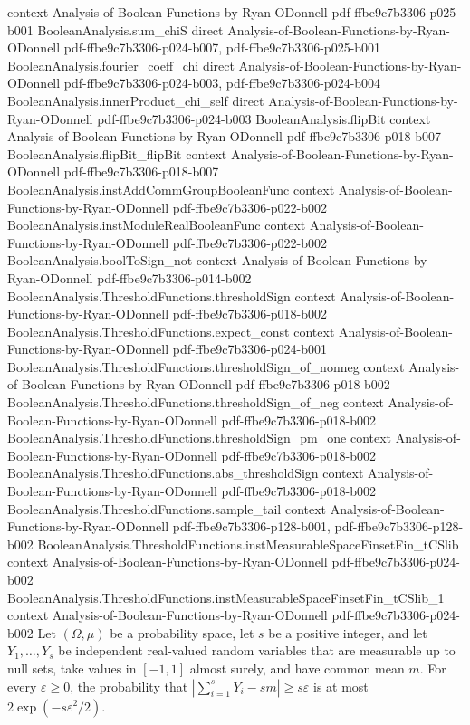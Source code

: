 \begin{theorem}
  {context}
  {Analysis-of-Boolean-Functions-by-Ryan-ODonnell}
  {pdf-ffbe9c7b3306-p025-b001}
\proofstep
  {BooleanAnalysis.sum_chiS}
  {direct}
  {Analysis-of-Boolean-Functions-by-Ryan-ODonnell}
  {pdf-ffbe9c7b3306-p024-b007,
    pdf-ffbe9c7b3306-p025-b001}
\proofstep
  {BooleanAnalysis.fourier_coeff_chi}
  {direct}
  {Analysis-of-Boolean-Functions-by-Ryan-ODonnell}
  {pdf-ffbe9c7b3306-p024-b003,
    pdf-ffbe9c7b3306-p024-b004}
\proofstep
  {BooleanAnalysis.innerProduct_chi_self}
  {direct}
  {Analysis-of-Boolean-Functions-by-Ryan-ODonnell}
  {pdf-ffbe9c7b3306-p024-b003}
\proofstep
  {BooleanAnalysis.flipBit}
  {context}
  {Analysis-of-Boolean-Functions-by-Ryan-ODonnell}
  {pdf-ffbe9c7b3306-p018-b007}
\proofstep
  {BooleanAnalysis.flipBit_flipBit}
  {context}
  {Analysis-of-Boolean-Functions-by-Ryan-ODonnell}
  {pdf-ffbe9c7b3306-p018-b007}
\proofstep
  {BooleanAnalysis.instAddCommGroupBooleanFunc}
  {context}
  {Analysis-of-Boolean-Functions-by-Ryan-ODonnell}
  {pdf-ffbe9c7b3306-p022-b002}
\proofstep
  {BooleanAnalysis.instModuleRealBooleanFunc}
  {context}
  {Analysis-of-Boolean-Functions-by-Ryan-ODonnell}
  {pdf-ffbe9c7b3306-p022-b002}
\proofstep
  {BooleanAnalysis.boolToSign_not}
  {context}
  {Analysis-of-Boolean-Functions-by-Ryan-ODonnell}
  {pdf-ffbe9c7b3306-p014-b002}
\proofstep
  {BooleanAnalysis.ThresholdFunctions.thresholdSign}
  {context}
  {Analysis-of-Boolean-Functions-by-Ryan-ODonnell}
  {pdf-ffbe9c7b3306-p018-b002}
\proofstep
  {BooleanAnalysis.ThresholdFunctions.expect_const}
  {context}
  {Analysis-of-Boolean-Functions-by-Ryan-ODonnell}
  {pdf-ffbe9c7b3306-p024-b001}
\proofstep
  {BooleanAnalysis.ThresholdFunctions.thresholdSign_of_nonneg}
  {context}
  {Analysis-of-Boolean-Functions-by-Ryan-ODonnell}
  {pdf-ffbe9c7b3306-p018-b002}
\proofstep
  {BooleanAnalysis.ThresholdFunctions.thresholdSign_of_neg}
  {context}
  {Analysis-of-Boolean-Functions-by-Ryan-ODonnell}
  {pdf-ffbe9c7b3306-p018-b002}
\proofstep
  {BooleanAnalysis.ThresholdFunctions.thresholdSign_pm_one}
  {context}
  {Analysis-of-Boolean-Functions-by-Ryan-ODonnell}
  {pdf-ffbe9c7b3306-p018-b002}
\proofstep
  {BooleanAnalysis.ThresholdFunctions.abs_thresholdSign}
  {context}
  {Analysis-of-Boolean-Functions-by-Ryan-ODonnell}
  {pdf-ffbe9c7b3306-p018-b002}
\proofstep
  {BooleanAnalysis.ThresholdFunctions.sample_tail}
  {context}
  {Analysis-of-Boolean-Functions-by-Ryan-ODonnell}
  {pdf-ffbe9c7b3306-p128-b001,
    pdf-ffbe9c7b3306-p128-b002}
\proofstep
  {BooleanAnalysis.ThresholdFunctions.instMeasurableSpaceFinsetFin_tCSlib}
  {context}
  {Analysis-of-Boolean-Functions-by-Ryan-ODonnell}
  {pdf-ffbe9c7b3306-p024-b002}
\proofstep
  {BooleanAnalysis.ThresholdFunctions.instMeasurableSpaceFinsetFin_tCSlib_1}
  {context}
  {Analysis-of-Boolean-Functions-by-Ryan-ODonnell}
  {pdf-ffbe9c7b3306-p024-b002}
Let $(\Omega,\mu)$ be a probability space, let $s$ be a positive integer, and let
$Y_1,\ldots,Y_s$ be independent real-valued random variables that are measurable up to
null sets, take values in $[-1,1]$ almost surely, and have common mean $m$. For every
$\varepsilon\ge 0$, the probability that $\left|\sum_{i=1}^s Y_i-sm\right|\ge
s\varepsilon$ is at most $2\exp(-s\varepsilon^2/2)$.
\end{theorem}

